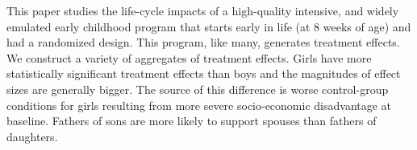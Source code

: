 \noindent This paper studies the life-cycle impacts of a high-quality intensive, and widely emulated early childhood program that starts early in life (at 8 weeks of age) and had a randomized design. This program, like many, generates treatment effects. We construct a variety of aggregates of treatment effects. Girls have more statistically significant treatment effects than boys and the magnitudes of effect sizes are generally bigger. The source of this difference is worse control-group conditions for girls resulting from more severe socio-economic disadvantage at baseline. Fathers of sons are more likely to support spouses than fathers of daughters.
